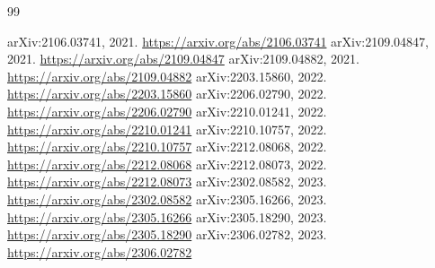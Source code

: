 \documentclass{article}
\begin{document}
\begin{thebibliography}{99}

 arXiv:2106.03741, 2021. \url{https://arxiv.org/abs/2106.03741}
 arXiv:2109.04847, 2021. \url{https://arxiv.org/abs/2109.04847}
 arXiv:2109.04882, 2021. \url{https://arxiv.org/abs/2109.04882}
 arXiv:2203.15860, 2022. \url{https://arxiv.org/abs/2203.15860}
 arXiv:2206.02790, 2022. \url{https://arxiv.org/abs/2206.02790}
 arXiv:2210.01241, 2022. \url{https://arxiv.org/abs/2210.01241}
 arXiv:2210.10757, 2022. \url{https://arxiv.org/abs/2210.10757}
 arXiv:2212.08068, 2022. \url{https://arxiv.org/abs/2212.08068}
 arXiv:2212.08073, 2022. \url{https://arxiv.org/abs/2212.08073}
 arXiv:2302.08582, 2023. \url{https://arxiv.org/abs/2302.08582}
 arXiv:2305.16266, 2023. \url{https://arxiv.org/abs/2305.16266}
 arXiv:2305.18290, 2023. \url{https://arxiv.org/abs/2305.18290}
 arXiv:2306.02782, 2023. \url{https://arxiv.org/abs/2306.02782}

\end{thebibliography}

\end{document}
